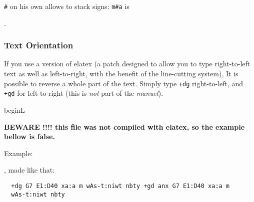 \documentclass[final]{article}
\begin{document}
\verb/#/ on his own allows to stack signs: 
\verb/m#a/ is 
\begin{hieroglyph}{\leavevmode {}}\end{hieroglyph}.

\subsubsection{Text Orientation}

If you use a version of elatex (a patch designed to allow you to
type right-to-left text as well as left-to-right, with the benefit of
the line-cutting system), It is possible to reverse a whole part of
the text. Simply type \verb/+dg/ right-to-left, and \verb/+gd/ for
left-to-right (this is {\em not\/} part of the {\em manuel\/}).

\expandafter\ifx\csname beginL\endcsname\relax %
\def\beginL{\relax}             %
\def\beginR{\relax} \def\endR{\relax} \def\endL{\relax}

{\bf BEWARE !!!! this file was not compiled with elatex, so the
  example bellow is false.} \fi

Example:
\begin{hieroglyph}{\leavevmode \rightleft\HwordSpace
{}\HwordSpace
{}\HwordSpace
{}\HwordSpace
{}\HwordSpace
{}\HinterSignsSpace
{}\HwordSpace
{}\HwordSpace
\leftright\HwordSpace
{}\HwordSpace
{}\HwordSpace
{}\HwordSpace
{}\HwordSpace
{}\HwordSpace
{}\HinterSignsSpace
{}\HwordSpace
{}}\end{hieroglyph}, made like that: 
\begin{verbatim}
  +dg G7 E1:D40 xa:a m wAs-t:niwt nbty +gd anx G7 E1:D40 xa:a m
  wAs-t:niwt nbty
\end{verbatim}
\end{document}
